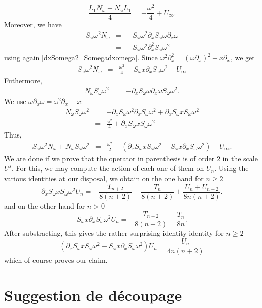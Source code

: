 \documentclass[a4paper]{article}
\begin{document}
\[\frac{L_1 N_\omega + N_\omega L_1}{4} = -\frac{\omega^2}{4} + U_\infty.\]
Moreover, we have
\begin{eqnarray*}
	S_\omega \omega^2 N_\omega &=& -S_\omega \omega^2 \partial_x S_\omega \omega \partial_x \omega\\
	&=& -S_\omega \omega^2 \partial_x^2 S_\omega \omega^2
\end{eqnarray*}
using again \autoref{dxSomega2=Somegadxomega}. Since $\omega^2 \partial_x ^2 = (\omega \partial_x)^2 + x \partial_x$, we get
\begin{eqnarray*}
	S_\omega \omega^2 N_\omega &=& \frac{\omega^2}{4} - S_\omega x \partial_x S_\omega \omega^2 + U_\infty
\end{eqnarray*}
Futhermore, 
\begin{eqnarray*}
	N_\omega S_\omega \omega^2 &=& -\partial_x S_\omega \omega \partial_x \omega S_\omega \omega^2.
\end{eqnarray*}
We use $\omega \partial_x \omega = \omega^2 \partial_x - x$:
\begin{eqnarray*}
	N_\omega S_\omega \omega^2 &=& -\partial_x S_\omega \omega^2 \partial_x S_\omega \omega^2 + \partial_x S_\omega x S_\omega \omega^2\\
	&=& \frac{\omega^2}{4} + \partial_x S_\omega x S_\omega \omega^2 
\end{eqnarray*}
Thus, 
\begin{eqnarray*}
	S_\omega \omega^2 N_\omega + N_\omega S_\omega \omega^2 &=& \frac{\omega^2}{2} + \left(\partial_x S_\omega xS_\omega \omega^2  - S_\omega x \partial_x  S_\omega \omega^2 \right)+ U_\infty.
\end{eqnarray*}
We are done if we prove that the operator in parenthesis is of order $2$ in the scale $U^s$. For this, we may compute the action of each one of them on $U_n$. Using the various identities at our disposal, we obtain on the one hand for $n\geq 2$ 
\[\partial_x S_\omega x S_\omega \omega^2 U_n = -\frac{T_{n+2}}{8(n+2)} -\frac{T_n}{8(n+2)} +  \frac{U_{n} + U_{n-2}}{8n(n+2)}. \]
and on the other hand for $n>0$ 
\[S_\omega x \partial_x S_\omega \omega^2 U_n = -\frac{T_{n+2}}{8(n+2)} - \frac{T_n}{8n}.\]
After substracting, this gives the rather surprising identity identity for $n \geq 2$
\[\left(\partial_x S_\omega xS_\omega \omega^2  - S_\omega x \partial_x  S_\omega \omega^2 \right)U_n = \frac{U_n}{4n(n+2)}\]
which of course proves our claim.

\section{Suggestion de découpage}
\end{document}
